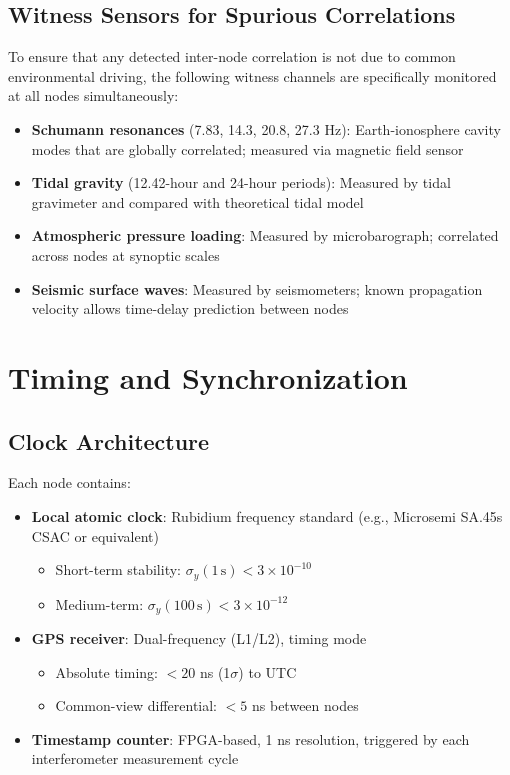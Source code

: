 \documentclass[12pt,a4paper]{article}
\begin{document}
\subsection{Witness Sensors for Spurious Correlations}

To ensure that any detected inter-node correlation is not due to
common environmental driving, the following witness channels are
specifically monitored at all nodes simultaneously:

\begin{itemize}
\item \textbf{Schumann resonances} (7.83, 14.3, 20.8, 27.3 Hz):
Earth-ionosphere cavity modes that are globally correlated; measured
via magnetic field sensor
\item \textbf{Tidal gravity} (12.42-hour and 24-hour periods): Measured
by tidal gravimeter and compared with theoretical tidal model
\item \textbf{Atmospheric pressure loading}: Measured by microbarograph;
correlated across nodes at synoptic scales
\item \textbf{Seismic surface waves}: Measured by seismometers; known
propagation velocity allows time-delay prediction between nodes
\end{itemize}


\section{Timing and Synchronization}\label{sec:timing}

\subsection{Clock Architecture}

Each node contains:
\begin{itemize}
\item \textbf{Local atomic clock}: Rubidium frequency standard
(e.g., Microsemi SA.45s CSAC or equivalent)
\begin{itemize}
\item Short-term stability: $\sigma_y(1\,\text{s}) < 3 \times 10^{-10}$
\item Medium-term: $\sigma_y(100\,\text{s}) < 3 \times 10^{-12}$
\end{itemize}
\item \textbf{GPS receiver}: Dual-frequency (L1/L2), timing mode
\begin{itemize}
\item Absolute timing: $< 20$ ns (1$\sigma$) to UTC
\item Common-view differential: $< 5$ ns between nodes
\end{itemize}
\item \textbf{Timestamp counter}: FPGA-based, 1 ns resolution, triggered
by each interferometer measurement cycle
\end{itemize}
\end{document}
